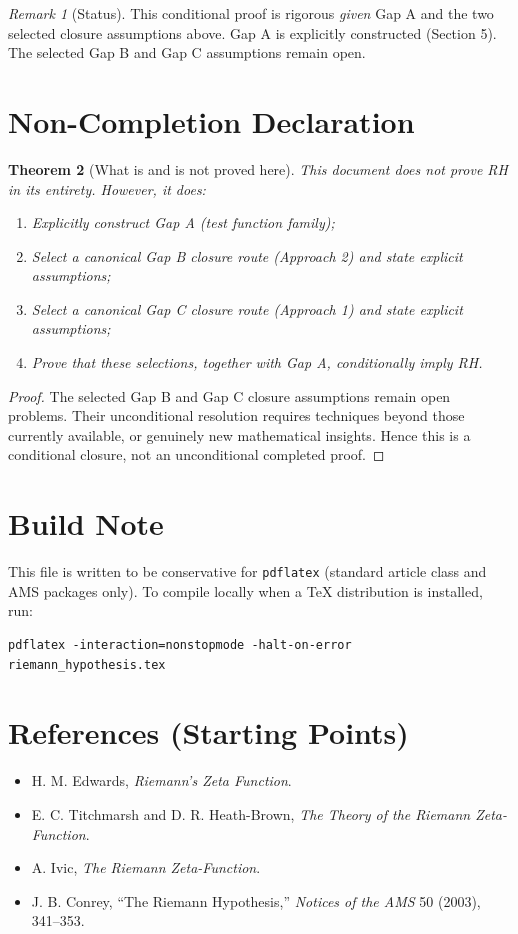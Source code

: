 \documentclass[11pt]{article}
\theoremstyle{plain}
\newtheorem{theorem}{Theorem}[section]
\theoremstyle{definition}
\theoremstyle{remark}
\newtheorem{remark}[theorem]{Remark}
\begin{document}
\begin{remark}[Status]
This conditional proof is rigorous \emph{given} Gap A and the two selected closure assumptions above.
Gap A is explicitly constructed (Section 5). The selected Gap B and Gap C assumptions remain open.
\end{remark}

\section{Non-Completion Declaration}
\begin{theorem}[What is and is not proved here]
This document does not \emph{prove} RH in its entirety. However, it does:
\begin{enumerate}
  \item Explicitly construct Gap A (test function family);
  \item Select a canonical Gap B closure route (Approach 2) and state explicit assumptions;
  \item Select a canonical Gap C closure route (Approach 1) and state explicit assumptions;
  \item Prove that these selections, together with Gap A, conditionally imply RH.
\end{enumerate}
\end{theorem}

\begin{proof}
The selected Gap B and Gap C closure assumptions remain open problems. Their unconditional resolution
requires techniques beyond those currently available, or genuinely new mathematical insights.
Hence this is a conditional closure, not an unconditional completed proof.
\end{proof}

\section{Build Note}
This file is written to be conservative for \texttt{pdflatex} (standard article class and AMS packages only).
To compile locally when a TeX distribution is installed, run:
\begin{verbatim}
pdflatex -interaction=nonstopmode -halt-on-error riemann_hypothesis.tex
\end{verbatim}

\section{References (Starting Points)}
\begin{itemize}
  \item H. M. Edwards, \emph{Riemann's Zeta Function}.
  \item E. C. Titchmarsh and D. R. Heath-Brown, \emph{The Theory of the Riemann Zeta-Function}.
  \item A. Ivic, \emph{The Riemann Zeta-Function}.
  \item J. B. Conrey, ``The Riemann Hypothesis,'' \emph{Notices of the AMS} 50 (2003), 341--353.
\end{itemize}
\end{document}
